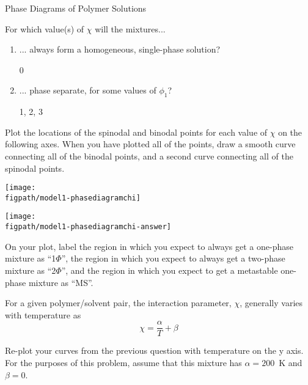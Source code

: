 \begin{activity}{Phase Diagrams of Polymer Solutions}
\begin{ctqs}

	\question For which value(s) of $\chi$ will the mixtures...
	
		\begin{enumerate}
			\item ... always form a homogeneous, single-phase solution?
				
				\begin{solution}[0.75in]{}
					0
				\end{solution}
			
			\item ... phase separate, for some values of $\phi_1$?
				\begin{solution}[0.75in]{}
					1, 2, 3
				\end{solution}
		\end{enumerate}
		
	\question Plot the locations of the spinodal and binodal points for each value of $\chi$ on the following axes.  When you have plotted all of the points, draw a smooth curve connecting all of the binodal points, and a second curve connecting all of the spinodal points.
	
		\begin{solution}[2in]{\centerline{\texttt{[image: \\figpath/model1-phasediagramchi]}}}
		\centerline{\texttt{[image: \\figpath/model1-phasediagramchi-answer]}}
		\end{solution}
		
	\question On your plot, label the region in which you expect to always get a one-phase mixture as ``1$\Phi$'', the region in which you expect to always get a two-phase mixture as ``2$\Phi$'', and the region in which you expect to get a metastable one-phase mixture as ``MS''.
		
\end{ctqs}


\begin{infobox}
	For a given polymer/solvent pair, the interaction parameter, $\chi$, generally varies with temperature as
	\begin{equation*}
		\chi = \frac{\alpha}{T} + \beta
	\end{equation*}
\end{infobox}


\begin{ctqs}

	\question Re-plot your curves from the previous question with temperature on the y axis.  For the purposes of this problem, assume that this mixture has $\alpha=200$~K and $\beta=0$.
		\label{\labelbase:ctq:plotT}
	

\end{ctqs}
\end{activity}

